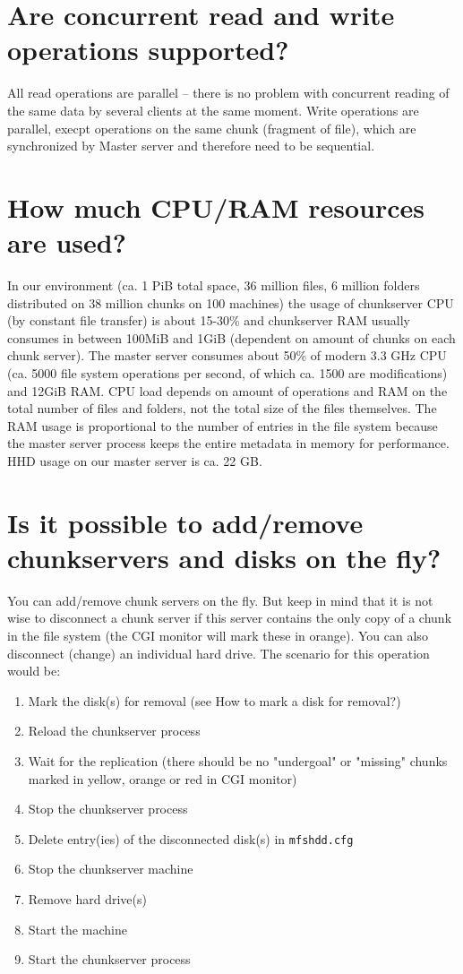 \documentclass[a4paper,11pt,english]{report}
\def\code#1{\texttt{#1}}
\begin{document}
		\section{Are concurrent read and write operations supported?}
		All read operations are parallel -- there is no problem with concurrent reading of the same data by several clients at the same moment.
		Write operations are parallel, execpt operations on the same chunk (fragment of file), which are synchronized by Master server and therefore need to be sequential.
		
		\section{How much CPU/RAM resources are used?}
		In our environment (ca. 1 PiB total space, 36 million files, 6 million folders distributed on 38 million chunks on 100 machines) the usage of chunkserver CPU (by constant file transfer) is about 15-30\% and chunkserver RAM usually consumes in between 100MiB and 1GiB (dependent on amount of chunks on each chunk server). The master server consumes about 50\% of modern 3.3 GHz CPU (ca. 5000 file system operations per second, of which ca. 1500 are modifications) and 12GiB RAM. CPU load depends on amount of operations and RAM on the total number of files and folders, not the total size of the files themselves. The RAM usage is proportional to the number of entries in the file system because the master server process keeps the entire metadata in memory for performance. HHD usage on our master server is ca. 22 GB. 
		 

		\section{Is it possible to add/remove chunkservers and disks on the fly?}
		You can add/remove chunk servers on the fly. But keep in mind that it is not wise to disconnect a chunk server if this server contains the only copy of a chunk in the file system (the CGI monitor will mark these in orange). You can also disconnect (change) an individual hard drive. The scenario for this operation would be:
		\begin{enumerate}
			\item Mark the disk(s) for removal (see How to mark a disk for removal?)
			\item Reload the chunkserver process
			\item Wait for the replication (there should be no "undergoal" or "missing" chunks marked in yellow, orange or red in CGI monitor)
			\item Stop the chunkserver process
			\item Delete entry(ies) of the disconnected disk(s) in \code{mfshdd.cfg}
			\item Stop the chunkserver machine
			\item Remove hard drive(s)
			\item Start the machine
			\item Start the chunkserver process
		\end{enumerate}
		
\end{document}
